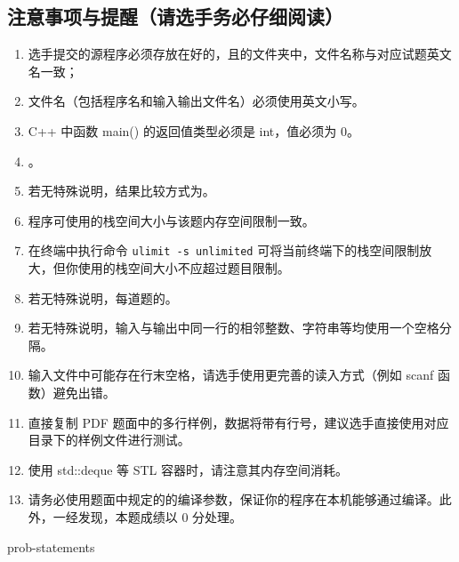 \documentclass{\string~/.hexagon/assets/statement}
\begin{document}
\begin{titlepage}
  \begingroup\titleformat{\subsection}{\bf}{}{0pt}{\hspace{0.5em}}\subsection{注意事项与提醒（请选手务必仔细阅读）}\endgroup
  \begin{enumerate}
    \item 选手提交的源程序必须存放在好的，且的文件夹中，文件名称与对应试题英文名一致；
    \item 文件名（包括程序名和输入输出文件名）必须使用英文小写。
    \item C++ 中函数 main() 的返回值类型必须是 int，值必须为 0。
    \item {}。
    \item 若无特殊说明，结果比较方式为。
    \item 程序可使用的栈空间大小与该题内存空间限制一致。
    \item 在终端中执行命令 \texttt{ulimit -s unlimited} 可将当前终端下的栈空间限制放大，但你使用的栈空间大小不应超过题目限制。
    \item 若无特殊说明，每道题的。
    \item 若无特殊说明，输入与输出中同一行的相邻整数、字符串等均使用一个空格分隔。
    \item 输入文件中可能存在行末空格，请选手使用更完善的读入方式（例如 scanf 函数）避免出错。
    \item 直接复制 PDF 题面中的多行样例，数据将带有行号，建议选手直接使用对应目录下的样例文件进行测试。
    \item 使用 std::deque 等 STL 容器时，请注意其内存空间消耗。
    \item 请务必使用题面中规定的的编译参数，保证你的程序在本机能够通过编译。此外，一经发现，本题成绩以 0 分处理。
  \end{enumerate}
\end{titlepage}

\clearpage

{{prob-statements}}
\end{document}
